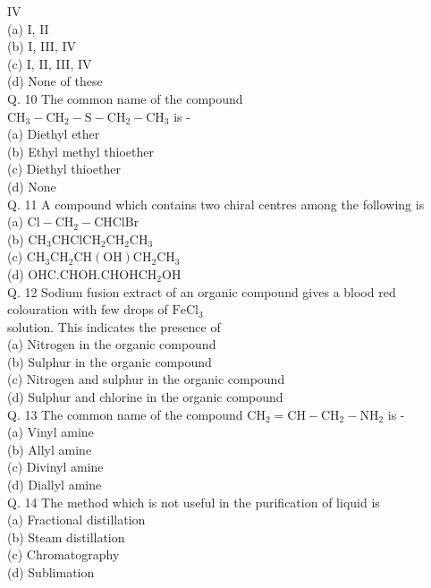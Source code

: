 \documentclass[10pt]{article}
\begin{document}
IV\\
(a) I, II\\
(b) I, III, IV\\
(c) I, II, III, IV\\
(d) None of these\\
Q. 10 The common name of the compound\\
$\mathrm{CH}_{3}-\mathrm{CH}_{2}-\mathrm{S}-\mathrm{CH}_{2}-\mathrm{CH}_{3}$ is -\\
(a) Diethyl ether\\
(b) Ethyl methyl thioether\\
(c) Diethyl thioether\\
(d) None\\
Q. 11 A compound which contains two chiral centres among the following is\\
(a) $\mathrm{Cl}-\mathrm{CH}_{2}-\mathrm{CHClBr}$\\
(b) $\mathrm{CH}_{3} \mathrm{CHClCH}_{2} \mathrm{CH}_{2} \mathrm{CH}_{3}$\\
(c) $\mathrm{CH}_{3} \mathrm{CH}_{2} \mathrm{CH}(\mathrm{OH}) \mathrm{CH}_{2} \mathrm{CH}_{3}$\\
(d) $\mathrm{OHC} . \mathrm{CHOH} . \mathrm{CHOHCH}_{2} \mathrm{OH}$\\
Q. 12 Sodium fusion extract of an organic compound gives a blood red colouration with few drops of $\mathrm{FeCl}_{3}$\\
solution. This indicates the presence of\\
(a) Nitrogen in the organic compound\\
(b) Sulphur in the organic compound\\
(c) Nitrogen and sulphur in the organic compound\\
(d) Sulphur and chlorine in the organic compound\\
Q. 13 The common name of the compound $\mathrm{CH}_{2}=\mathrm{CH}-\mathrm{CH}_{2}-\mathrm{NH}_{2}$ is -\\
(a) Vinyl amine\\
(b) Allyl amine\\
(c) Divinyl amine\\
(d) Diallyl amine\\
Q. 14 The method which is not useful in the purification of liquid is\\
(a) Fractional distillation\\
(b) Steam distillation\\
(c) Chromatography\\
(d) Sublimation\\
\end{document}
